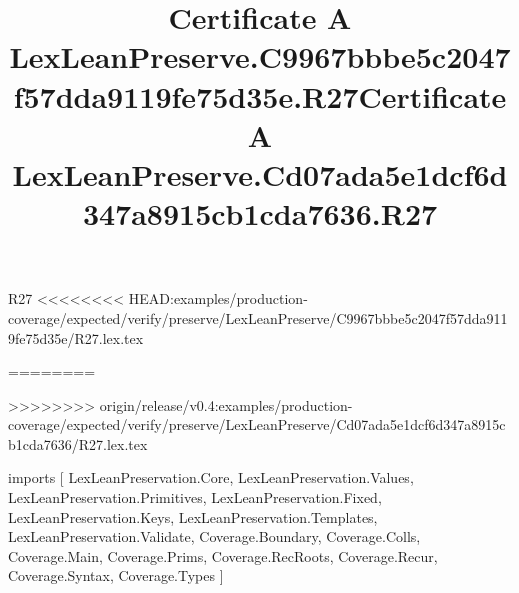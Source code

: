 \begin{lexlean}{R27}
<<<<<<<< HEAD:examples/production-coverage/expected/verify/preserve/LexLeanPreserve/C9967bbbe5c2047f57dda9119fe75d35e/R27.lex.tex
\title{Certificate A LexLeanPreserve.C9967bbbe5c2047f57dda9119fe75d35e.R27}
========
\title{Certificate A LexLeanPreserve.Cd07ada5e1dcf6d347a8915cb1cda7636.R27}
>>>>>>>> origin/release/v0.4:examples/production-coverage/expected/verify/preserve/LexLeanPreserve/Cd07ada5e1dcf6d347a8915cb1cda7636/R27.lex.tex
\begin{coremodule}
imports [
  LexLeanPreservation.Core,
  LexLeanPreservation.Values,
  LexLeanPreservation.Primitives,
  LexLeanPreservation.Fixed,
  LexLeanPreservation.Keys,
  LexLeanPreservation.Templates,
  LexLeanPreservation.Validate,
  Coverage.Boundary,
  Coverage.Colls,
  Coverage.Main,
  Coverage.Prims,
  Coverage.RecRoots,
  Coverage.Recur,
  Coverage.Syntax,
  Coverage.Types
]


\end{coremodule}
\end{lexlean}
